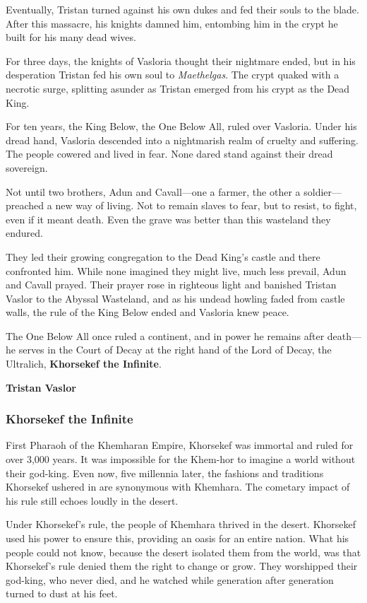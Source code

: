 \documentclass[10pt,a4paper,twoside,bg=print,twocolumn,openany,nodeprecatedcode]{dndbook}
\begin{document}
Eventually, Tristan turned against his own dukes and fed their souls to the blade. After this massacre, his knights damned him, entombing him in the crypt he built for his many dead wives.

For three days, the knights of Vasloria thought their nightmare ended, but in his desperation Tristan fed his own soul to \textit{Maethelgas}. The crypt quaked with a necrotic surge, splitting asunder as Tristan emerged from his crypt as the Dead King.

For ten years, the King Below, the One Below All, ruled over Vasloria. Under his dread hand, Vasloria descended into a nightmarish realm of cruelty and suffering. The people cowered and lived in fear. None dared stand against their dread sovereign.

Not until two brothers, Adun and Cavall—one a farmer, the other a soldier—preached a new way of living. Not to remain slaves to fear, but to resist, to fight, even if it meant death. Even the grave was better than this wasteland they endured.

They led their growing congregation to the Dead King's castle and there confronted him. While none imagined they might live, much less prevail, Adun and Cavall prayed. Their prayer rose in righteous light and banished Tristan Vaslor to the Abyssal Wasteland, and as his undead howling faded from castle walls, the rule of the King Below ended and Vasloria knew peace.

The One Below All once ruled a continent, and in power he remains after death—he serves in the Court of Decay at the right hand of the Lord of Decay, the Ultralich, \textbf{Khorsekef the Infinite}.

\textbf{Tristan Vaslor}

\subsubsection{Khorsekef the Infinite}
First Pharaoh of the Khemharan Empire, Khorsekef was immortal and ruled for over 3,000 years. It was impossible for the Khem-hor to imagine a world without their god-king. Even now, five millennia later, the fashions and traditions Khorsekef ushered in are synonymous with Khemhara. The cometary impact of his rule still echoes loudly in the desert.

Under Khorsekef's rule, the people of Khemhara thrived in the desert. Khorsekef used his power to ensure this, providing an oasis for an entire nation. What his people could not know, because the desert isolated them from the world, was that Khorsekef's rule denied them the right to change or grow. They worshipped their god-king, who never died, and he watched while generation after generation turned to dust at his feet.
\end{document}
